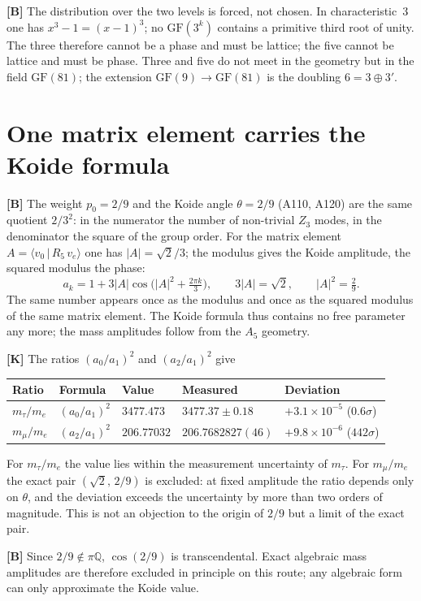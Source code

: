\textbf{[B]} The distribution over the two levels is forced, not chosen. In
characteristic~3 one has $x^3-1=(x-1)^3$; no $\mathrm{GF}(3^k)$ contains a
primitive third root of unity. The three therefore cannot be a phase and must
be lattice; the five cannot be lattice and must be phase. Three and five do
not meet in the geometry but in the field $\mathrm{GF}(81)$; the extension
$\mathrm{GF}(9)\to\mathrm{GF}(81)$ is the doubling $6=3\oplus3'$.

\section{One matrix element carries the Koide formula}

\textbf{[B]} The weight $p_0=2/9$ and the Koide angle $\theta=2/9$ (A110, A120)
are the same quotient $2/3^2$: in the numerator the number of non-trivial
$Z_3$ modes, in the denominator the square of the group order. For the matrix
element $A=\langle v_0\,|\,R_5\,v_e\rangle$ one has $|A|=\sqrt2/3$; the
modulus gives the Koide amplitude, the squared modulus the phase:
\[
  a_k = 1 + 3|A|\cos\bigl(|A|^2 + \tfrac{2\pi k}{3}\bigr),\qquad
  3|A| = \sqrt2,\qquad |A|^2 = \tfrac29 .
\]
The same number appears once as the modulus and once as the squared modulus of
the same matrix element. The Koide formula thus contains no free parameter any
more; the mass amplitudes follow from the $A_5$ geometry.

\textbf{[K]} The ratios $(a_0/a_1)^2$ and $(a_2/a_1)^2$ give
\begin{center}
\small
\begin{tabular}{@{}lllll@{}}
\toprule
Ratio & Formula & Value & Measured & Deviation \\
\midrule
$m_\tau/m_e$ & $(a_0/a_1)^2$ & $3477.473$ & $3477.37\pm0.18$ & $+3.1\times10^{-5}$ ($0.6\sigma$) \\
$m_\mu/m_e$ & $(a_2/a_1)^2$ & $206.77032$ & $206.7682827(46)$ & $+9.8\times10^{-6}$ ($442\sigma$) \\
\bottomrule
\end{tabular}
\end{center}
For $m_\tau/m_e$ the value lies within the measurement uncertainty of
$m_\tau$. For $m_\mu/m_e$ the exact pair $(\sqrt2,\,2/9)$ is excluded: at fixed
amplitude the ratio depends only on $\theta$, and the deviation exceeds the
uncertainty by more than two orders of magnitude.
This is not an objection to the origin of $2/9$ but a limit of the exact pair.

\textbf{[B]} Since $2/9\notin\pi\mathbb{Q}$, $\cos(2/9)$ is transcendental.
Exact algebraic mass amplitudes are therefore excluded in principle on this
route; any algebraic form can only approximate the Koide value.


